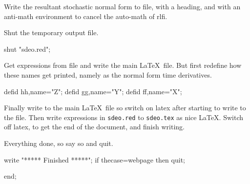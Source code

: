 \documentclass[11pt,a5paper]{article}
\begin{document}

Write the resultant stochastic normal form to file, with a heading, and with an anti-math environment to cancel the auto-math of rlfi.

Shut the temporary output file.
\begin{reduce}
shut "sdeo.red";
\end{reduce}

Get expressions from file and write the main \LaTeX\ file.
But first redefine how these names get printed, namely as the normal form time derivatives. 
\begin{reduce}
defid hh,name="\dot Z";
defid gg,name="\dot Y";
defid ff,name="\dot X";
\end{reduce}

Finally write to the main \LaTeX\ file so switch on latex after starting to write to the file.
Then write expressions in \verb|sdeo.red| to \verb|sdeo.tex| as nice \LaTeX.
Switch off latex, to get the end of the document, and finish writing.

Everything done, so say so and quit.
\begin{reduce}
write "***** Finished *****";
if thecase=webpage then quit;
\end{reduce}


\begin{reduce}
end;
\end{reduce}








\end{document}
